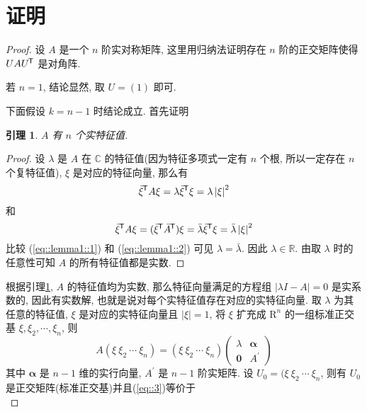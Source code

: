 \documentclass{ctexart}
\newtheorem{lemma}{引理}[section]
\newcommand*{\tran}{^{\mkern-1.5mu\mathsf{T}}}
\begin{document}
\section{证明} %
\label{sec:证明}
\begin{proof}
设 $A$ 是一个 $n$ 阶实对称矩阵, 这里用归纳法证明存在 $n$ 阶的正交矩阵使得 $UAU\tran$ 是对角阵.\par
若 $n = 1$, 结论显然, 取 $U = (1)$ 即可. \par
下面假设 $k = n - 1$ 时结论成立. 首先证明\par
\begin{lemma}
\label{thm::lemma::lm1}
$A$ 有 $n$ 个实特征值.
\end{lemma}
\begin{proof}
	设 $\lambda$ 是 $A$ 在 $\mathbb{C}$ 的特征值(因为特征多项式一定有 $n$ 个根, 所以一定存在 $n$ 个复特征值), $\xi$ 是对应的特征向量, 那么有
	\begin{equation}
	\label{eq::lemma1::1}
		\bar{\xi}\tran A\xi = \lambda\bar{\xi}\tran\xi = \lambda\left|\xi\right|^2
	\end{equation}
	和
	\begin{equation}
	\label{eq::lemma1::2}
		\bar{\xi}\tran A\xi = (\bar{\xi}\tran \bar{A}\tran)\xi = \bar{\lambda}\bar{\xi}\tran\xi = \bar{\lambda}\left|\xi\right|^2
	\end{equation}
	比较 (\ref{eq::lemma1::1}) 和 (\ref{eq::lemma1::2}) 可见 $\lambda = \bar{\lambda}$. 因此 $\lambda \in \mathbb{R}$. 由取 $\lambda$ 时的任意性可知 $A$ 的所有特征值都是实数.
\end{proof}\par
根据引理\ref{thm::lemma::lm1}, $A$ 的特征值均为实数, 那么特征向量满足的方程组 $\left|\lambda I - A\right| = 0$ 是实系数的, 因此有实数解, 也就是说对每个实特征值存在对应的实特征向量. 取 $\lambda$ 为其任意的特征值, $\xi$ 是对应的实特征向量且 $\left|\xi\right| = 1$, 将 $\xi$ 扩充成 $\mathrm{R}^n$ 的一组标准正交基 $\xi, \xi_2, \cdots, \xi_n$, 则
\begin{equation}
\label{eq::3}
	A(\xi \  \xi_2 \  \cdots \  \xi_n) = (\xi \  \xi_2 \  \cdots \  \xi_n)\left(\begin{matrix}
	\lambda & \mathbf{\alpha} \\
	\mathbf{0} & A^\prime
	\end{matrix}\right)
\end{equation}
其中 $\mathbf{\alpha}$ 是 $n - 1$ 维的实行向量, $A^\prime$ 是 $n - 1$ 阶实矩阵. 设 $U_0 = (\xi \  \xi_2 \  \cdots \  \xi_n$, 则有 $U_0$ 是正交矩阵(标准正交基)并且(\ref{eq::3})等价于
\begin{equation}

\end{equation}
\end{proof}
\end{document}

